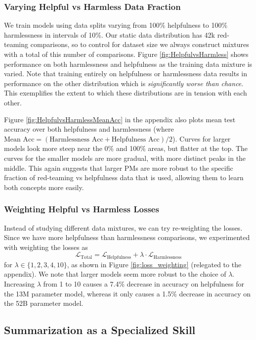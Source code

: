 \subsubsection{Varying Helpful vs Harmless Data Fraction}

We train models using data splits varying from 100\% helpfulness  to  100\% harmlessness in intervals of 10\%. Our static data distribution has 42k red-teaming comparisons, so to control for dataset size we always construct mixtures with a total of this number of comparisons.  Figure \ref{fig:HelpfulvsHarmless} shows performance on both harmlessness and helpfulness as the training data mixture is varied. Note that training entirely on helpfulness or harmlessness data results in performance on the other distribution which is \emph{significantly worse than chance}.  This exemplifies the extent to which these distributions are in tension with each other.

Figure \ref{fig:HelpfulvsHarmlessMeanAcc} in the appendix also plots mean test accuracy over both helpfulness and harmlessness (where $\text{Mean Acc} = (\text{Harmlessness Acc} + \text{Helpfulness Acc})/2$). Curves for larger models look more steep near the 0\% and 100\% areas, but flatter at the top. The curves for the smaller models are more gradual, with more distinct peaks in the middle. This again suggests that larger PMs are more robust to the specific fraction of red-teaming vs helpfulness data that is used, allowing them to learn both concepts more easily. 

\subsubsection{Weighting Helpful vs Harmless Losses}

Instead of studying different data mixtures, we can try re-weighting the losses. Since we have more helpfulness than harmlessness comparisons, we experimented with weighting the losses as $$
    \mathcal{L}_{\text{Total}} =  \mathcal{L}_{\text{Helpfulness}} + \lambda \cdot \mathcal{L}_{\text{Harmlessness}} 
    $$
for $\lambda \in \{1, 2, 3, 4, 10\}$, as shown in Figure \ref{fig:loss_weighting} (relegated to the appendix). We  note that larger models seem more robust to the choice of $\lambda$. Increasing $\lambda$ from 1 to 10 causes a 7.4\% decrease in accuracy on helpfulness for the 13M parameter model, whereas it only causes a 1.5\% decrease in accuracy on the 52B parameter model.

\subsection{Summarization as a Specialized Skill}
\label{sec:LtS}

